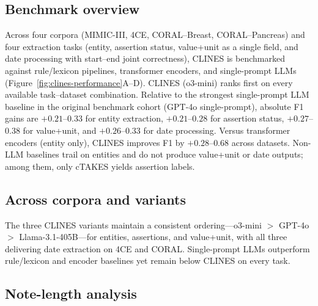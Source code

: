 \subsection{Benchmark overview}

Across four corpora (MIMIC-III, 4CE, CORAL--Breast, CORAL--Pancreas) and four extraction tasks (entity, assertion status, value+unit as a single field, and date processing with start--end joint correctness), CLINES is benchmarked against rule/lexicon pipelines, transformer encoders, and single-prompt LLMs (Figure~\ref{fig:clines-performance}A--D). CLINES (o3-mini) ranks first on every available task--dataset combination. Relative to the strongest single-prompt LLM baseline in the original benchmark cohort (GPT-4o single-prompt), absolute F1 gains are $+0.21$--$0.33$ for entity extraction, $+0.21$--$0.28$ for assertion status, $+0.27$--$0.38$ for value+unit, and $+0.26$--$0.33$ for date processing. Versus transformer encoders (entity only), CLINES improves F1 by $+0.28$--$0.68$ across datasets. Non-LLM baselines trail on entities and do not produce value+unit or date outputs; among them, only cTAKES yields assertion labels.




\subsection{Across corpora and variants}

The three CLINES variants maintain a consistent ordering---o3-mini $>$ GPT-4o $>$ Llama-3.1-405B---for entities, assertions, and value+unit, with all three delivering date extraction on 4CE and CORAL. Single-prompt LLMs outperform rule/lexicon and encoder baselines yet remain below CLINES on every task. 

\subsection{Note-length analysis}

